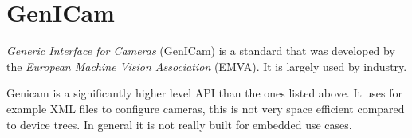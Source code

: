 \section {GenICam}
\textit{Generic Interface for Cameras} (GenICam) is a standard that was
developed by the \textit{European Machine Vision Association} (EMVA). It is
largely used by industry.

Genicam is a significantly higher level API than the ones listed above. It
uses for example XML files to configure cameras, this is not very space
efficient compared to device trees. In general it is not really built for
embedded use cases.


